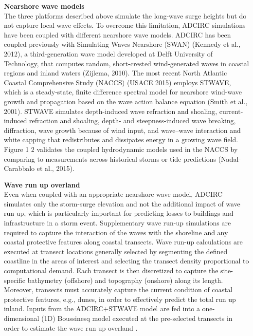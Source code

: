 \noindent\textbf{Nearshore wave models} \\The three platforms described above simulate the long-wave surge heights but do not capture local wave effects. To overcome this limitation, ADCIRC simulations have been coupled with different nearshore wave models. ADCIRC has been coupled previously with Simulating Waves Nearshore (SWAN) (Kennedy et al., 2012), a third-generation wave model developed at Delft University of Technology, that computes random, short-crested wind-generated waves in coastal regions and inland waters (Zijlema, 2010). The most recent North Atlantic Coastal Comprehensive Study (NACCS) (USACE 2015) employs STWAVE, which is a steady-state, finite difference spectral model for nearshore wind-wave growth and propagation based on the wave action balance equation (Smith et al., 2001). STWAVE simulates depth-induced wave refraction and shoaling, current-induced refraction and shoaling, depth- and steepness-induced wave breaking, diffraction, wave growth because of wind input, and wave–wave interaction and white capping that redistributes and dissipates energy in a growing wave field. Figure 1 2 validates the coupled hydrodynamic models used in the NACCS by comparing to measurements across historical storms or tide predictions (Nadal-Carabbalo et al., 2015). 
\newline

\noindent\textbf{Wave run up overland} \\Even when coupled with an appropriate nearshore wave model, ADCIRC simulates only the storm-surge elevation and not the additional impact of wave run up, which is particularly important for predicting losses to buildings and infrastructure in a storm event. Supplementary wave run-up simulations are required to capture the interaction of the waves with the shoreline and any coastal protective features along coastal transects. Wave run-up calculations are executed at transect locations generally selected by segmenting the defined coastline in the areas of interest and selecting the transect density proportional to computational demand. Each transect is then discretized to capture the site-specific bathymetry (offshore) and topography (onshore) along its length. Moreover, transects must accurately capture the current condition of coastal protective features, e.g., dunes, in order to effectively predict the total run up inland. Inputs from the ADCIRC+STWAVE model are fed into a one-dimensional (1D) Boussinesq model executed at the pre-selected transects in order to estimate the wave run up overland \citep{demirbilek_2009}. 
\newline


